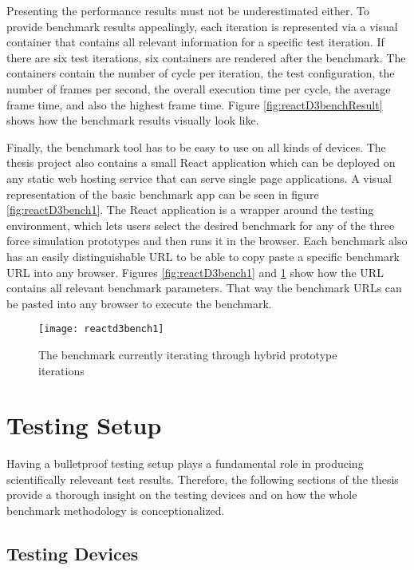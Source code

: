Presenting the performance results must not be underestimated either. To provide benchmark results appealingly, each iteration is represented via a visual container that contains all relevant information for a specific test iteration. If there are six test iterations, six containers are rendered after the benchmark. The containers contain the number of cycle per iteration, the test configuration, the number of frames per second, the overall execution time per cycle, the average frame time, and also the highest frame time. Figure \ref{fig:reactD3benchResult} shows how the benchmark results visually look like.

Finally, the benchmark tool has to be easy to use on all kinds of devices. The thesis project also contains a small React application which can be deployed on any static web hosting service that can serve single page applications. A visual representation of the basic benchmark app can be seen in figure \ref{fig:reactD3bench1}. The React application is a wrapper around the testing environment, which lets users select the desired benchmark for any of the three force simulation prototypes and then runs it in the browser. Each benchmark also has an easily distinguishable URL to be able to copy paste a specific benchmark URL into any browser. Figures \ref{fig:reactD3bench1} and \ref{fig:reactD3bench2} show how the URL contains all relevant benchmark parameters. That way the benchmark URLs can be pasted into any browser to execute the benchmark. 

\begin{figure}
  \centering
  \texttt{[image: reactd3bench1]}
  \caption{The benchmark currently iterating through hybrid prototype iterations}
  \label{fig:reactD3bench2}
\end{figure}

\section{Testing Setup}

Having a bulletproof testing setup plays a fundamental role in producing scientifically releveant test results. Therefore, the following sections of the thesis provide a thorough insight on the testing devices and on how the whole benchmark methodology is conceptionalized. 

\subsection{Testing Devices}


